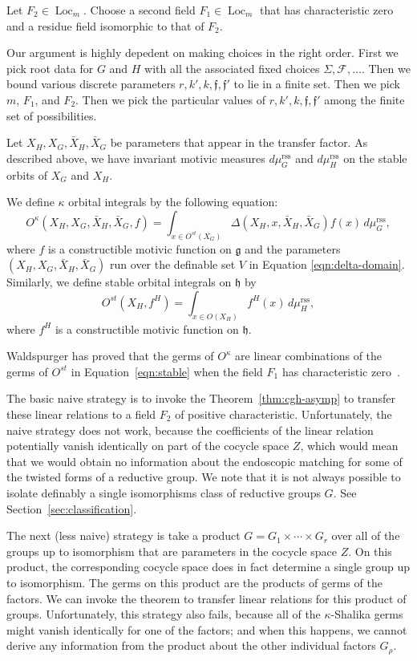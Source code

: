 \documentclass[12pt]{amsart}
\newcommand{\op}[1]{\operatorname{#1}}
\def\s{{\mathfrak{f}}}
\newcommand{\cF}{\mathcal{F}}
\newcommand{\fg}{\mathfrak{g}}
\newcommand{\fh}{\mathfrak{h}}
\newcommand{\reg}{\mathrm{rss}}
\theoremstyle{plain}
\theoremstyle{definition}
\begin{document}
Let $F_2\in\op{Loc}_m$.  Choose a second field $F_1\in \op{Loc}_m$ that
has characteristic zero and a residue field isomorphic to that of
$F_2$.

Our argument is highly depedent on making choices in the right
order.  First we pick root data for $G$ and $H$ with all the
associated fixed choices $\Sigma,\cF,\ldots$.  Then we bound various
discrete parameters 
$r,k',k,\s,\s'$ to lie in a finite set.  Then we pick $m$, $F_1$, and $F_2$.
Then we pick the particular values of $r,k',k,\s,\s'$ among the finite
set of possibilities.

Let $X_H,X_G,\bar X_H,\bar X_G$ be parameters that appear in the
transfer factor.  As described above, we have invariant motivic 
measures $d\mu^\reg_G$
and $d\mu^\reg_H$ on the stable orbits of $X_G$ and $X_H$.

We define $\kappa$ orbital integrals by the following equation:
\begin{equation}\label{eqn:kappa}
O^\kappa(X_H,X_G,\bar X_H,\bar X_G,f) = \int_{x\in O^{st}(X_G)}
\Delta(X_H,x,\bar X_H,\bar X_G) f (x)\,d\mu^\reg_G,
\end{equation}
where $f$ is a constructible motivic function on $\fg$ and the
parameters $(X_H,X_G,\bar X_H,\bar X_G)$ run over the definable set
$V$ in Equation \ref{eqn:delta-domain}.  Similarly, we define stable
orbital integrals on $\fh$ by
\begin{equation}\label{eqn:stable}
O^{st}(X_H,f^H) = \int_{x\in O(X_H)} f^H (x)\,d\mu^\reg_H,
\end{equation}
where $f^H$ is a constructible motivic function on $\fh$.


Waldspurger has proved that the germs of $O^\kappa$ are linear
combinations of the germs of $O^{st}$ in Equation~\ref{eqn:stable} when
the field $F_1$ has characteristic zero~\cite{waldspurger1997lemme}.

The basic naive strategy is to invoke the Theorem~\ref{thm:cgh-asymp} to transfer these
linear relations to a field $F_2$ of positive characteristic.
Unfortunately, the naive strategy does not work, because the
coefficients of the linear relation potentially vanish identically
on part of the cocycle space $Z$, which would mean that we would
obtain no information about the endoscopic matching for some of the
twisted forms of a reductive group.  We note that it is not always
possible to isolate definably a single isomorphisms class of reductive
groups $G$.  See Section~\ref{sec:classification}.

The next (less naive) strategy is take a product $G =
G_1\times\cdots\times G_r$ over all of the groups up to isomorphism
that are parameters in the cocycle space $Z$.  On this product, the
corresponding cocycle space does in fact determine a single group up
to isomorphism.  The germs on this product are the products of germs
of the factors.  We can invoke the theorem to transfer linear
relations for this product of groups.  Unfortunately, this strategy
also fails, because all of the $\kappa$-Shalika germs might vanish
identically for one of the factors; and when this happens, we cannot
derive any information from the product about the other individual factors
$G_\rho$.
\end{document}
